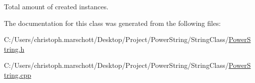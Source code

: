 Total amount of created instances. 



The documentation for this class was generated from the following files\+:\begin{DoxyCompactItemize}
\item 
C\+:/\+Users/christoph.\+marschott/\+Desktop/\+Project/\+Power\+String/\+String\+Class/\hyperlink{_power_string_8h}{Power\+String.\+h}\item 
C\+:/\+Users/christoph.\+marschott/\+Desktop/\+Project/\+Power\+String/\+String\+Class/\hyperlink{_power_string_8cpp}{Power\+String.\+cpp}\end{DoxyCompactItemize}
